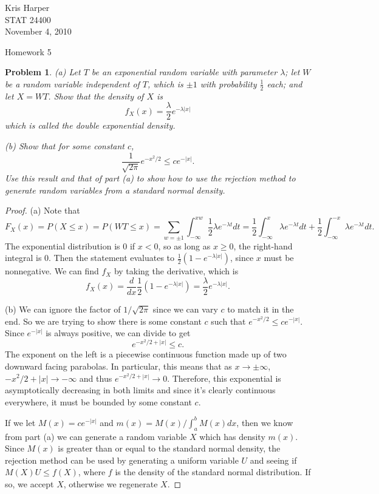 \documentclass{article}
\newtheorem{problem}{Problem}
\begin{document}
\begin{flushright}
Kris Harper\\

STAT 24400\\

November 4, 2010
\end{flushright}

\begin{center}
Homework 5
\end{center}

\begin{problem}
(a) Let $T$ be an exponential random variable with parameter $\lambda$; let $W$ be a random variable independent of $T$, which is $\pm 1$ with probability $\frac{1}{2}$ each; and let $X = WT$. Show that the density of $X$ is
\[
f_X(x) = \frac{\lambda}{2} e^{-\lambda |x|}
\]
which is called the \emph{double exponential density}.

(b) Show that for some constant $c$,
\[
\frac{1}{\sqrt{2\pi}} e^{-x^2/2} \leq c e^{-|x|}.
\]
Use this result and that of part (a) to show how to use the rejection method to generate random variables from a standard normal density.
\end{problem}
\begin{proof}
(a) Note that
\[
F_X(x) = P(X \leq x) = P(WT \leq x) = \sum_{w = \pm 1} \int_{-\infty}^{xw} \frac{1}{2} \lambda e^{- \lambda t} dt = \frac{1}{2} \int_{-\infty}^x \lambda e^{-\lambda t} dt + \frac{1}{2} \int_{-\infty}^{-x} \lambda e^{-\lambda t}dt.
\]
The exponential distribution is $0$ if $x < 0$, so as long as $x \geq 0$, the right-hand integral is $0$. Then the statement evaluates to $\frac{1}{2}(1 - e^{- \lambda |x|})$, since $x$ must be nonnegative. We can find $f_X$ by taking the derivative, which is
\[
f_X(x) = \frac{d}{dx} \frac{1}{2} (1 - e^{- \lambda |x|}) = \frac{\lambda}{2} e^{- \lambda |x|}.
\]

(b) We can ignore the factor of $1/\sqrt{2 \pi}$ since we can vary $c$ to match it in the end. So we are trying to show there is some constant $c$ such that $e^{-x^2/2} \leq c e^{-|x|}$. Since $e^{-|x|}$ is always positive, we can divide to get
\[
e^{-x^2/2 + |x|} \leq c.
\]
The exponent on the left is a piecewise continuous function made up of two downward facing parabolas. In particular, this means that as $x \rightarrow \pm \infty$, $-x^2/2 + |x| \rightarrow -\infty$ and thus $e^{-x^2/2 + |x|} \rightarrow 0$. Therefore, this exponential is asymptotically decreasing in both limits and since it's clearly continuous everywhere, it must be bounded by some constant $c$.

If we let $M(x) = ce^{-|x|}$ and $m(x) = M(x)/\int_a^b M(x) dx$, then we know from part (a) we can generate a random variable $X$ which has density $m(x)$. Since $M(x)$ is greater than or equal to the standard normal density, the rejection method can be used by generating a uniform variable $U$ and seeing if $M(X)U \leq f(X)$, where $f$ is the density of the standard normal distribution. If so, we accept $X$, otherwise we regenerate $X$.
\end{proof}
\end{document}
